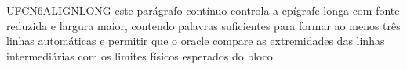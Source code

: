 UFCN6ALIGNLONG este parágrafo contínuo controla a epígrafe longa com fonte reduzida e largura maior, contendo palavras suficientes para formar ao menos três linhas automáticas e permitir que o oracle compare as extremidades das linhas intermediárias com os limites físicos esperados do bloco.
